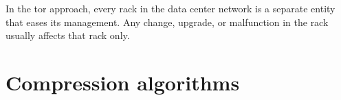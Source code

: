 In the \ac{tor} approach, every rack in the data center network is a separate entity that eases its management. Any change, upgrade, or malfunction in the rack usually affects that rack only.

\section{Compression algorithms}







